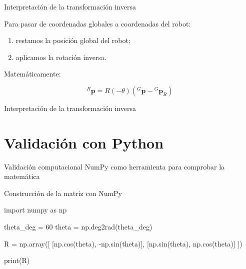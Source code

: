 \documentclass[aspectratio=169]{beamer}
\begin{document}
\begin{frame}{Interpretación de la transformación inversa}

    Para pasar de coordenadas globales a coordenadas del robot:

    \begin{enumerate}
        \item restamos la posición global del robot;
        \item aplicamos la rotación inversa.
    \end{enumerate}

    Matemáticamente:

    \[
    {}^{R}\mathbf{p}
    =
    R(-\theta)
    \left(
    {}^{G}\mathbf{p}
    -
    {}^{G}\mathbf{p}_R
    \right)
    \]

\end{frame}

\begin{frame}{Interpretación de la transformación inversa}


\end{frame}

\section{Validación con Python}

\SectionSlide
{Validación computacional}
{NumPy como herramienta para comprobar la matemática}

\begin{frame}[fragile]{Construcción de la matriz con NumPy}

    \begin{pythoncodedark}
        import numpy as np

        theta_deg = 60
        theta = np.deg2rad(theta_deg)

        R = np.array([
            [np.cos(theta), -np.sin(theta)],
            [np.sin(theta),  np.cos(theta)]
            ])

        print(R)
    \end{pythoncodedark}

\end{frame}
\end{document}
